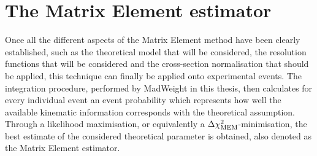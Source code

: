 \section{The Matrix Element estimator} \label{sec::MEMExample}   %

Once all the different aspects of the Matrix Element method have been clearly established, such as the theoretical model that will be considered, the resolution functions that will be considered and the cross-section normalisation that should be applied, this technique can finally be applied onto experimental events.
The integration procedure, performed by MadWeight in this thesis, then calculates for every individual event an event probability which represents how well the available kinematic information corresponds with the theoretical assumption. Through a likelihood maximisation, or equivalently a $\Delta \chi^{2}_{\textrm{MEM}}$-minimisation, the best estimate of the considered theoretical parameter is obtained, also denoted as the Matrix Element estimator.
\\

